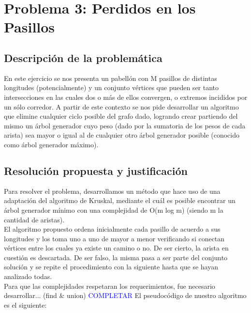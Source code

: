 \section{Problema 3: Perdidos en los Pasillos}

\subsection{Descripción de la problemática}

En este ejercicio se nos presenta un pabellón con M pasillos de distintas longitudes (potencialmente) y un conjunto vértices que pueden ser tanto intersecciones en las cuales dos o más de ellos convergen, o extremos incididos por un sólo corredor. 
A partir de este contexto se nos pide desarrollar un algoritmo que elimine cualquier ciclo posible del grafo dado, logrando crear partiendo del mismo un árbol generador cuyo peso (dado por la sumatoria de los pesos de cada arista) sea mayor o igual al de cualquier otro árbol generador posible (conocido como árbol generador máximo).

\subsection{Resolución propuesta y justificación}

Para resolver el problema, desarrollamos un método que hace uso de una adaptación del algoritmo de Kruskal, mediante el cuál es posible encontrar un árbol generador mínimo con una complejidad de O(m log m) (siendo m la cantidad de aristas).\\
El algoritmo propuesto ordena inicialmente cada pasillo de acuerdo a sus longitudes y los toma uno a uno de mayor a menor verificando si conectan vértices entre los cuales ya existe un camino o no. De ser cierto, la arista en cuestión es descartada. De ser falso, la misma pasa a ser parte del conjunto solución y se repite el procedimiento con la siguiente hasta que se hayan analizado todas.\\
Para que las complejidades respetaran los requerimientos, fue necesario desarrollar... (find & union) \textcolor{blue}{COMPLETAR} 
El pseudocódigo de nuestro algoritmo es el siguiente:

